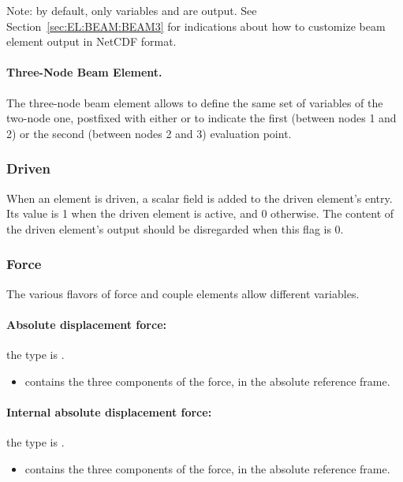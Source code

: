 Note: by default, only variables 
and  are output.
See Section~\ref{sec:EL:BEAM:BEAM3} for indications
about how to customize beam element output in NetCDF format.

\paragraph{Three-Node Beam Element.}
The three-node beam element allows to define the same set of variables
of the two-node one, postfixed with either  or 
to indicate the first (between nodes 1 and 2)
or the second (between nodes 2 and 3)
evaluation point.



\subsubsection{Driven}
\label{sec:NetCDF:Elem:Driven}

When an element is driven, a scalar field  is added to the driven element's entry.
Its value is 1 when the driven element is active, and 0 otherwise.
The content of the driven element's output should be disregarded when this flag is 0.


\subsubsection{Force}
\label{sec:NetCDF:Elem:Force}

The various flavors of force and couple elements allow different variables.

\paragraph{Absolute displacement force:}
the type is .
\begin{itemize}
\item {} contains the three components of the force, in the absolute reference frame.
\end{itemize}

\paragraph{Internal absolute displacement force:}
the type is .
\begin{itemize}
\item {} contains the three components of the force, in the absolute reference frame.
\end{itemize}


